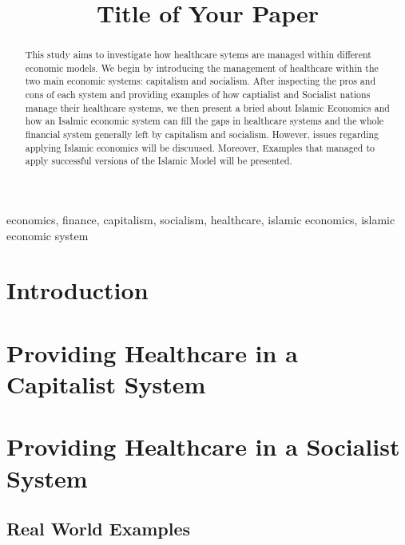 \documentclass[conference]{IEEEtran}
\begin{document}
\title{Title of Your Paper}

\author{
}

\maketitle

\begin{abstract}
This study aims to investigate how healthcare sytems are managed within
different economic models. We begin by introducing the management of healthcare
within the two main economic systems: capitalism and socialism. After inspecting the
pros and cons of each system and providing examples of how captialist and Socialist
nations manage their healthcare systems, we then present a bried about Islamic Economics
and how an Isalmic economic system can fill the gaps in healthcare systems and the whole
financial system generally left by capitalism and socialism. However, issues regarding applying
Islamic economics will be discuused. Moreover, Examples that managed to apply successful versions
of the Islamic Model will be presented. 
\end{abstract}

\begin{IEEEkeywords}
economics, finance, capitalism, socialism, healthcare, islamic economics,
islamic economic system
\end{IEEEkeywords}

\section{Introduction}


\section{Providing Healthcare in a Capitalist System}


\section{Providing Healthcare in a Socialist System}


\subsection{Real World Examples}
\end{document}
